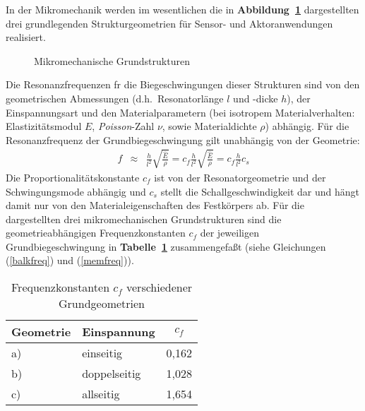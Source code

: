 In der Mikromechanik werden im wesentlichen die in
{\bf Abbildung~\ref{abbgrundgeometrien}}
dargestellten drei grundlegenden Strukturgeometrien für Sensor- und
Aktoranwendungen realisiert.
\begin{figure}[htb]
\begin{center}

\setabbzs
\end{center}
\caption{\label{abbgrundgeometrien}
 Mikromechanische Grundstrukturen}
\end{figure}
Die Resonanzfrequenzen fr die
Biegeschwingungen dieser Strukturen sind von den geometrischen
Abmessungen (d.h.\ Resonatorlänge $l$ und -dicke $h$), der Einspannungsart
und den Materialparametern (bei isotropem Materialverhalten:
Elastizitätsmodul $E$, {\sl Poisson}-Zahl $ \nu $, sowie Materialdichte
$\rho$) abhängig. Für die Resonanzfrequenz der Grundbiegeschwingung
gilt unabhängig von der Geometrie:
%
\begin{eqnarray}
\label{freqskal}
      f & \approx & \frac{h}{l^{2}} \sqrt{ \frac{\hat E}{ \rho}}
         = c_{f} \frac{h}{l^{2}} \sqrt{ \frac{\hat E}{ \rho}}
         = c_{f} \frac{h}{l^{2}} c_{s}
\end{eqnarray}
%
Die Proportionalitätskonstante $c_{f}$ ist von der Resonatorgeometrie
und der Schwingungsmode abhängig und $c_{s}$ stellt die Schallgeschwindigkeit
dar und hängt damit nur von den Materialeigenschaften des Festkörpers ab.
Für die dargestellten drei
mikromechanischen Grundstrukturen sind die geometrieabhängigen
Frequenzkonstanten $c_{f}$ der jeweiligen Grundbiegeschwingung
in {\bf Tabelle~\ref{tabcf}} zusammengefaßt
(siehe Gleichungen (\ref{balkfreq})
und (\ref{memfreq})).
\begin{table}[htb]
\caption{\label{tabcf}
 Frequenzkonstanten $c_{f}$ verschiedener Grundgeometrien}
\begin{center}
\begin{tabular} {|l|l||c|}
\hline
 Geometrie  &  Einspannung      &  $c_{f}$ \\
\hline \hline
 a)  &  einseitig     & 0,162 \\
 b)  &  doppelseitig  & 1,028 \\
 c)  &  allseitig     & 1,654 \\
\hline
\end{tabular}
\end{center}
\end{table}
